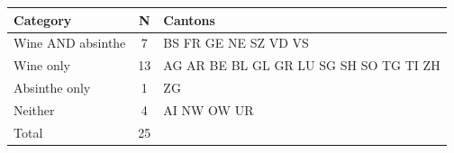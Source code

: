 \begin{tabular}{lcl}
\toprule
Category & N & Cantons \\
\midrule
Wine AND absinthe & 7 & BS FR GE NE SZ VD VS \\
Wine only & 13 & AG AR BE BL GL GR LU SG SH SO TG TI ZH \\
Absinthe only & 1 & ZG \\
Neither & 4 & AI NW OW UR \\
\midrule
Total & 25 & \\
\bottomrule
\end{tabular}
